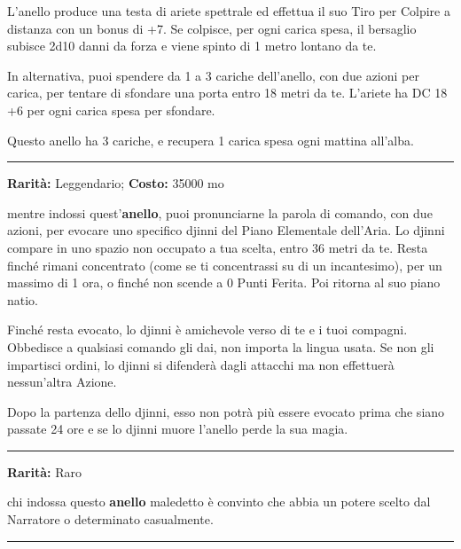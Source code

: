 \begin{multicols}{2}
L'anello produce una testa di ariete spettrale ed effettua il suo Tiro per Colpire a distanza con un bonus di +7. Se colpisce, per ogni carica spesa, il bersaglio subisce 2d10 danni da forza e viene spinto di 1 metro lontano da te.

In alternativa, puoi spendere da 1 a 3 cariche dell'anello, con due azioni per carica, per tentare di sfondare una porta entro 18 metri da te. L'ariete ha DC 18 +6 per ogni carica spesa per sfondare.

Questo anello ha 3 cariche, e recupera 1 carica spesa ogni mattina all'alba.

\smallskip\noindent\rule{\linewidth}{2pt}  \hypertarget{Anellodell'EvocazionedelloDjinni}{}\medskip{}\noindent\label{Anellodell'EvocazionedelloDjinni}

\textbf{Rarità:} Leggendario; \textbf{Costo:} 35000 mo

mentre indossi quest'\textbf{anello}, puoi pronunciarne la parola di comando, con due azioni, per evocare uno specifico djinni del Piano Elementale dell'Aria. Lo djinni compare in uno spazio non occupato a tua scelta, entro 36 metri da te. Resta finché rimani concentrato (come se ti concentrassi su di un incantesimo), per un massimo di 1 ora, o finché non scende a 0 Punti Ferita. Poi ritorna al suo piano natio.

Finché resta evocato, lo djinni è amichevole verso di te e i tuoi compagni. Obbedisce a qualsiasi comando gli dai, non importa la lingua usata. Se non gli impartisci ordini, lo djinni si difenderà dagli attacchi ma non effettuerà nessun'altra Azione.

Dopo la partenza dello djinni, esso non potrà più essere evocato prima che siano passate 24 ore e se lo djinni muore l'anello perde la sua magia.

\smallskip\noindent\rule{\linewidth}{2pt}  \hypertarget{Anellodell'Inganno}{}\medskip{}\noindent\label{Anellodell'Inganno}

\textbf{Rarità:} Raro

chi indossa questo \textbf{anello} maledetto è convinto che abbia un potere scelto dal Narratore o determinato casualmente.

\smallskip\noindent\rule{\linewidth}{2pt}  \hypertarget{AnellodellaDebolezza}{}\medskip{}\noindent\label{AnellodellaDebolezza}


\end{multicols}
